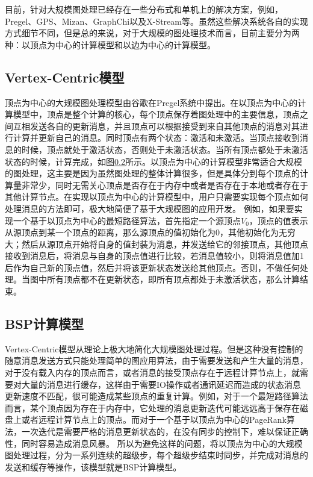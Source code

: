目前，针对大规模图处理已经存在一些分布式和单机上的解决方案，例如，Pregel、GPS、Mizan、GraphChi以及X-Stream等。虽然这些解决系统各自的实现方式细节不同，但是总的来说，对于大规模的图处理技术而言，目前主要分为两种：以顶点为中心的计算模型和以边为中心的计算模型。

\subsection{Vertex-Centric模型}
顶点为中心的大规模图处理模型由谷歌在Pregel系统中提出。在以顶点为中心的计算模型中，顶点是整个计算的核心，每个顶点保存着图处理中的主要信息，顶点之间互相发送各自的更新消息，并且顶点可以根据接受到来自其他顶点的消息对其进行计算并更新自己的消息。同时顶点有两个状态：激活和未激活。当顶点接收到消息的时候，顶点就处于激活状态，否则处于未激活状态。当所有顶点都处于未激活状态的时候，计算完成，如图\ref{}所示。以顶点为中心的计算模型非常适合大规模的图处理，这主要是因为虽然图处理的整体计算很多，但是具体分到每个顶点的计算量非常少，同时无需关心顶点是否存在于内存中或者是否存在于本地或者存在于其他计算节点。在实现以顶点为中心的计算模型中，用户只需要实现每个顶点如何处理消息的方法即可，极大地简便了基于大规模图的应用开发。
例如，如果要实现一个基于以顶点为中心的最短路径算法，首先指定一个源顶点$V_0$，顶点的值表示从源顶点到某一个顶点的距离，那么源顶点的值初始化为0，其他初始化为无穷大；然后从源顶点开始将自身的值封装为消息，并发送给它的邻接顶点，其他顶点接收到消息后，将消息与自身的顶点值进行比较，若消息值较小，则将消息值加1后作为自己新的顶点值，然后并将该更新状态发送给其他顶点。否则，不做任何处理。当图中所有顶点都不在更新状态，即所有顶点都处于未激活状态，那么计算结束。

\subsection{BSP计算模型}
Vertex-Centric模型从理论上极大地简化大规模图处理过程。但是这种没有控制的随意消息发送方式只能处理简单的图应用算法，由于需要发送和产生大量的消息，对于没有载入内存的顶点而言，或者消息的接受顶点存在于远程计算节点上，就需要对大量的消息进行缓存，这样由于需要IO操作或者通讯延迟而造成的状态消息更新速度不匹配，很可能造成某些顶点的重复计算。例如，对于一个最短路径算法而言，某个顶点因为存在于内存中，它处理的消息更新迭代可能远远高于保存在磁盘上或者远程计算节点上的顶点。而对于一个基于以顶点为中心的PageRank算法，一次迭代是需要严格的消息更新状态的，在没有同步的控制下，难以保证正确性，同时容易造成消息风暴。
所以为避免这样的问题，将以顶点为中心的大规模图处理过程，分为一系列连续的超级步，每个超级步结束时同步，并完成对消息的发送和缓存等操作，该模型就是BSP计算模型。

